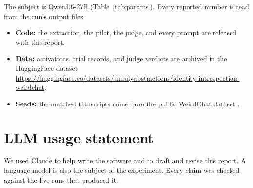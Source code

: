 \documentclass[11pt,letterpaper]{article}
\begin{document}
The subject is Qwen3.6-27B (Table~\ref{tab:params}). Every reported number is read from the run's output files.
\begin{itemize}[noitemsep, topsep=0pt, leftmargin=*]
    \item \textbf{Code:} the extraction, the pilot, the judge, and every
          prompt are released with this report.
    \item \textbf{Data:} activations, trial records, and judge verdicts
          are archived in the HuggingFace dataset\\
          \url{https://huggingface.co/datasets/unrulyabstractions/identity-introspection-weirdchat}.
    \item \textbf{Seeds:} the matched transcripts come from the public
          WeirdChat dataset \citep{transluce2025weirdchat}.
\end{itemize}

\clearpage



\section*{LLM usage statement}

We used Claude to help write the software and to draft and revise this report.
A language model is also the subject of the experiment. Every claim was
checked against the live runs that produced it.
\end{document}
